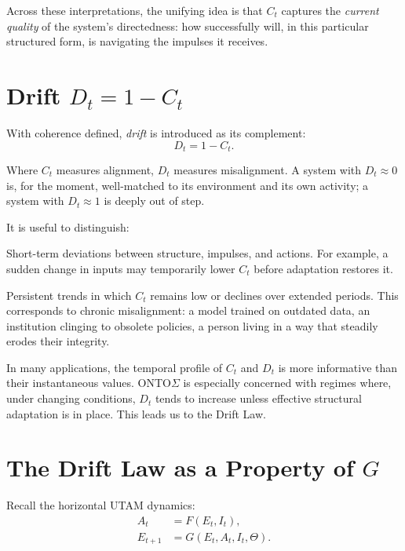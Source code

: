 \documentclass[12pt,a4paper]{report}
\begin{document}
Across these interpretations, the unifying idea is that \(C_t\) captures the \emph{current quality} of the system's directedness: how successfully will, in this particular structured form, is navigating the impulses it receives.

\section{Drift \texorpdfstring{\(D_t = 1 - C_t\)}{Dt = 1 - Ct}}

With coherence defined, \emph{drift} is introduced as its complement:
\[
    D_t = 1 - C_t.
\]

Where \(C_t\) measures alignment, \(D_t\) measures misalignment. A system with \(D_t \approx 0\) is, for the moment, well-matched to its environment and its own activity; a system with \(D_t \approx 1\) is deeply out of step.

It is useful to distinguish:

\begin{description}[leftmargin=2em]
    \item[Local drift.] Short-term deviations between structure, impulses, and actions. For example, a sudden change in inputs may temporarily lower \(C_t\) before adaptation restores it.
    \item[Long-term drift.] Persistent trends in which \(C_t\) remains low or declines over extended periods. This corresponds to chronic misalignment: a model trained on outdated data, an institution clinging to obsolete policies, a person living in a way that steadily erodes their integrity.
\end{description}

In many applications, the temporal profile of \(C_t\) and \(D_t\) is more informative than their instantaneous values. ONTO$\Sigma$ is especially concerned with regimes where, under changing conditions, \(D_t\) tends to increase unless effective structural adaptation is in place. This leads us to the Drift Law.

\section{The Drift Law as a Property of \texorpdfstring{\(G\)}{G}}

Recall the horizontal UTAM dynamics:
\begin{equation*}
\begin{aligned}
    A_t &= F(E_t, I_t), \\
    E_{t+1} &= G(E_t, A_t, I_t, \Theta).
\end{aligned}
\end{equation*}
\end{document}
